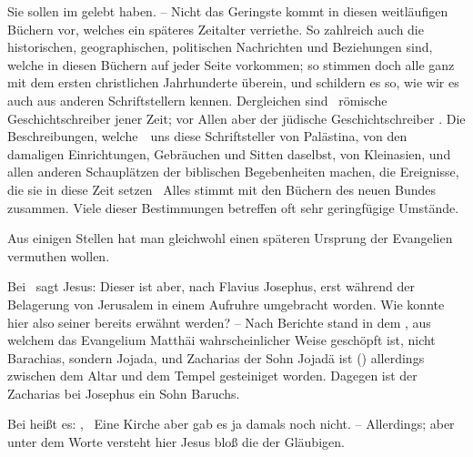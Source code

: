 \begin{aufza}
\item Sie sollen im  gelebt haben. -- Nicht das Geringste kommt in diesen weitläufigen Büchern vor, welches ein späteres Zeitalter verriethe. So zahlreich auch die historischen, geographischen, politischen Nachrichten und Beziehungen sind, welche in diesen Büchern auf jeder Seite vorkommen; so stimmen doch alle ganz mit dem ersten christlichen Jahrhunderte überein, und schildern es so, wie wir es auch aus anderen Schriftstellern kennen. Dergleichen sind  \ua\ römische Geschichtschreiber jener Zeit; vor Allen aber der jüdische Geschichtschreiber . Die Beschreibungen, welche~\ uns diese Schriftsteller von Palästina, von den damaligen Einrichtungen, Gebräuchen und Sitten daselbst, von Kleinasien, und allen anderen Schauplätzen der biblischen Begebenheiten machen, die Ereignisse, die sie in diese Zeit setzen \usw\  Alles stimmt mit den Büchern des neuen Bundes zusammen. Viele dieser Bestimmungen betreffen oft sehr geringfügige Umstände.
\begin{RWanm} 
Aus einigen Stellen hat man gleichwohl einen späteren Ursprung der Evangelien vermuthen wollen.
\begin{aufzb}
\item Bei \ sagt Jesus:  Dieser  ist aber, nach Flavius Josephus, erst während der Belagerung von Jerusalem in einem Aufruhre umgebracht worden. Wie konnte hier also seiner bereits erwähnt werden? -- Nach  Berichte stand in dem , aus welchem das Evangelium Matthäi wahrscheinlicher Weise geschöpft ist, nicht Barachias, sondern Jojada, und Zacharias der Sohn Jojadä ist () allerdings zwischen dem Altar und dem Tempel gesteiniget worden. Dagegen ist der Zacharias bei Josephus ein Sohn Baruchs.
\item Bei  heißt es: , \usw\ Eine Kirche aber gab es ja damals noch nicht. -- Allerdings; aber unter dem Worte  versteht hier Jesus bloß die  der Gläubigen.
\end{aufzb}
\end{RWanm}

\end{aufza}
